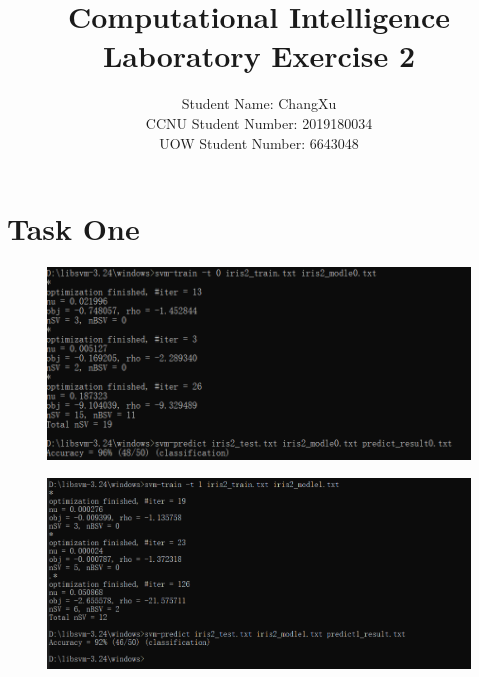 \documentclass[runningheads]{llncs}
\begin{document}
\title{\large{Computational Intelligence Laboratory Exercise 2}}
\author{\large{Student Name: ChangXu \\ %
CCNU Student Number: 2019180034 \\ %
UOW Student Number: 6643048}}  %



\maketitle



\section{Task One}
\begin{figure}[H]
    \centering
    \includegraphics[scale=0.8]{liner2.PNG}  
\end{figure}
\begin{figure}[H]
    \centering
    \includegraphics[scale=0.8]{poly2.PNG}  
\end{figure}
\end{document}
